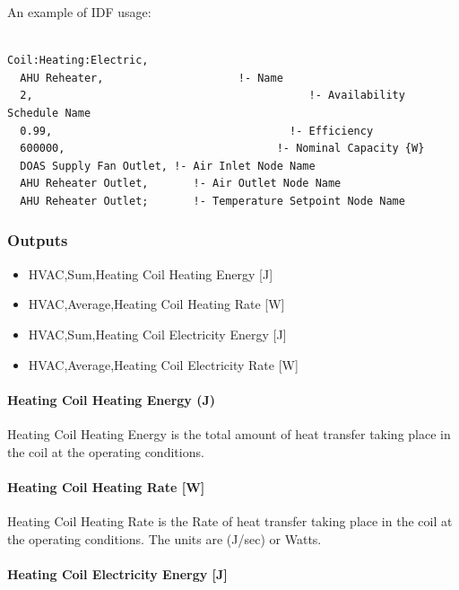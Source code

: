 An example of IDF usage:

\begin{lstlisting}

Coil:Heating:Electric,
  AHU Reheater,                     !- Name
  2,                                           !- Availability Schedule Name
  0.99,                                     !- Efficiency
  600000,                                 !- Nominal Capacity {W}
  DOAS Supply Fan Outlet, !- Air Inlet Node Name
  AHU Reheater Outlet,       !- Air Outlet Node Name
  AHU Reheater Outlet;       !- Temperature Setpoint Node Name
\end{lstlisting}

\subsubsection{Outputs}\label{outputs-2-011}

\begin{itemize}
\item
  HVAC,Sum,Heating Coil Heating Energy {[}J{]}
\item
  HVAC,Average,Heating Coil Heating Rate {[}W{]}
\item
  HVAC,Sum,Heating Coil Electricity Energy {[}J{]}
\item
  HVAC,Average,Heating Coil Electricity Rate {[}W{]}
\end{itemize}

\paragraph{Heating Coil Heating Energy (J)}\label{heating-coil-heating-energy-j-2}

Heating Coil Heating Energy is the total amount of heat transfer taking place in the coil at the operating conditions.

\paragraph{Heating Coil Heating Rate {[}W{]}}\label{heating-coil-heating-rate-w-2}

Heating Coil Heating Rate is the Rate of heat transfer taking place in the coil at the operating conditions. The units are (J/sec) or Watts.

\paragraph{Heating Coil Electricity Energy {[}J{]}}\label{heating-coil-electric-energy-j}

